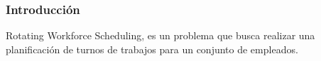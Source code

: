 \frame
{
\frametitle{Introducción}
Rotating Workforce Scheduling, es un problema que busca realizar una planificación de turnos de trabajos para un conjunto 
de empleados. 
}
